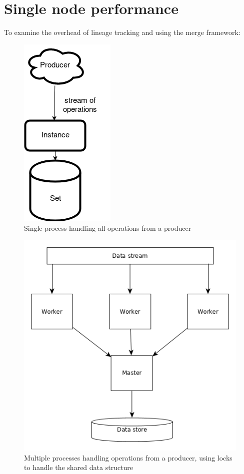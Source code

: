 \documentclass{article}
\begin{document}
\section{Single node performance}
To examine the overhead of lineage tracking and using the merge framework:
\begin{figure}[ht]
\centering
\caption{Single process handling all operations from a producer}
\includegraphics[width=0.2\textheight]{benchmark-single.png}
\end{figure}
\begin{figure}[ht]
\centering
\caption{Multiple processes handling operations from a producer, using locks to handle the shared data structure}
\includegraphics[width=0.3\textheight]{benchmark-serial.png}
\end{figure}
\end{document}
